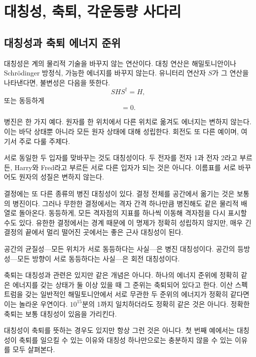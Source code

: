 \chapter{대칭성, 축퇴, 각운동량 사다리}
\providecommand{\ket}[1]{\left\lvert#1\right\rangle}

\section{대칭성과 축퇴 에너지 준위}

대칭성은 계의 물리적 기술을 바꾸지 않는 연산이다. 대칭 연산은 해밀토니안이나 Schr\"odinger 방정식, 가능한 에너지를 바꾸지 않는다. 유니터리 연산자 \(S\)가 그 연산을 나타낸다면, 불변성은 다음을 뜻한다.
\begin{equation}
S H S^\dagger=H,
\end{equation}
또는 동등하게
\begin{equation}
[S,H]=0.
\end{equation}

병진은 한 가지 예다. 원자를 한 위치에서 다른 위치로 옮겨도 에너지는 변하지 않는다. 이는 바닥 상태뿐 아니라 모든 원자 상태에 대해 성립한다. 회전도 또 다른 예이며, 여기서 주로 다룰 주제다.

서로 동일한 두 입자를 맞바꾸는 것도 대칭성이다. 두 전자를 전자 1과 전자 2라고 부르든, Harry와 Fred라고 부르든 서로 다른 입자가 되는 것은 아니다. 이름표를 서로 바꾸어도 원자의 성질은 변하지 않는다.

결정에는 또 다른 종류의 병진 대칭성이 있다. 결정 전체를 공간에서 옮기는 것은 보통의 병진이다. 그러나 무한한 결정에서는 격자 간격 하나만큼 병진해도 같은 물리적 배열로 돌아온다. 동등하게, 모든 격자점의 지표를 하나씩 이동해 격자점을 다시 표시할 수도 있다. 유한한 결정에서는 경계 때문에 이 명제가 정확히 성립하지 않지만, 매우 긴 결정의 끝에서 멀리 떨어진 곳에서는 좋은 근사 대칭성이 된다.

공간의 균질성---모든 위치가 서로 동등하다는 사실---은 병진 대칭성이다. 공간의 등방성---모든 방향이 서로 동등하다는 사실---은 회전 대칭성이다.

축퇴는 대칭성과 관련은 있지만 같은 개념은 아니다. 하나의 에너지 준위에 정확히 같은 에너지를 갖는 상태가 둘 이상 있을 때 그 준위는 축퇴되어 있다고 한다. 이산 스펙트럼을 갖는 일반적인 해밀토니안에서 서로 무관한 두 준위의 에너지가 정확히 같다면 이는 놀라운 우연이다. \(10^{15}\)분의 1까지 일치하더라도 정확히 같은 것은 아니다. 정확한 축퇴는 보통 대칭성이 있음을 가리킨다.

대칭성이 축퇴를 뜻하는 경우도 있지만 항상 그런 것은 아니다. 첫 번째 예에서는 대칭성이 축퇴를 일으킬 수 있는 이유와 대칭성 하나만으로는 충분하지 않을 수 있는 이유를 모두 살펴본다.

